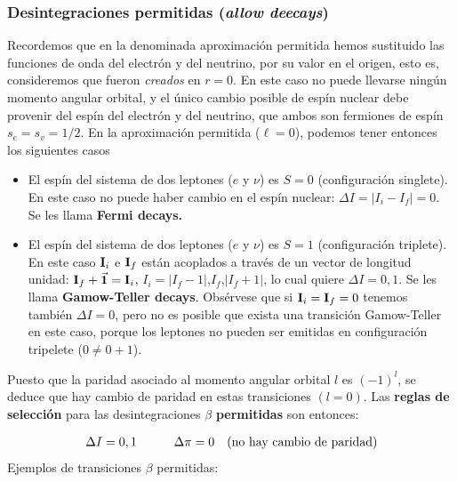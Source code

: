\subsubsection{Desintegraciones permitidas (\textit{allow deecays})}


Recordemos que en la denominada aproximación permitida hemos sustituido las funciones de onda del electrón y del neutrino, por su valor en el origen, esto es, consideremos que fueron \textit{creados} en $r=0$. En este caso no puede llevarse ningún momento angular orbital, y el único cambio posible de espín nuclear debe provenir del espín del electrón y del neutrino, que ambos son fermiones de espín $s_e=s_v=1/2$. En la aproximación permitida ($\ell=0$), podemos tener entonces los siguientes casos

\begin{itemize}
	\item El espín del sistema de dos leptones ($e$ y $\nu$) es $S=0$ (configuración singlete). En este caso no puede haber cambio en el espín nuclear: $\Delta I=|I_i-I_f|=0$. Se les llama \textbf{Fermi decays.}
	\item El espín del sistema de dos leptones ($e$ y $\nu$) es $S=1$ (configuración triplete). En este caso $\mathbf{I}_i$ e $\mathbf{I}_f$ están acoplados a través de un vector de longitud unidad: $\mathbf{I}_f + \vec{\mathbf{1}} = \mathbf{I}_i$, $I_i=|I_f-1|$,$I_f$,$|I_f+1|$, lo cual quiere $\Delta I = 0,1$. Se les llama \textbf{Gamow-Teller decays}. Obsérvese que si $\mathbf{I}_i=\mathbf{I}_f=0$ tenemos también $\Delta I=0$, pero no es posible que exista una transición Gamow-Teller en este caso, porque los leptones no pueden ser emitidas en configuración tripelete ($0\neq 0+1$).
\end{itemize}
Puesto que la paridad asociado al momento angular orbital $l$ es $(-1)^l$, se deduce que hay cambio de paridad en estas transiciones $(l=0)$. Las \textbf{reglas de selección} para las desintegraciones $\beta$ \textbf{permitidas} son entonces:

\begin{eqnarray}
	\Delta I =0,1 \quad \quad \quad \Delta \pi = 0 \quad (\text{no hay cambio de paridad})
\end{eqnarray}
Ejemplos de transiciones $\beta$ permitidas:

